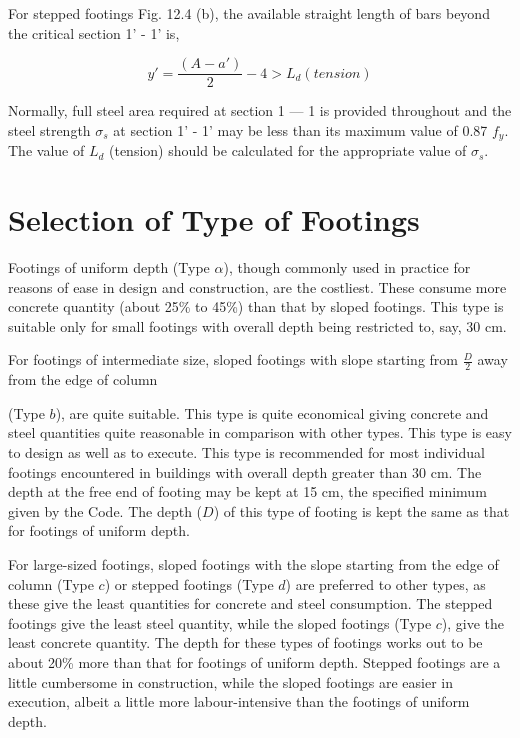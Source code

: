 \documentclass{book}
\begin{document}
For stepped footings Fig. 12.4 (b), the available straight length of bars beyond the critical
section 1’ - 1’ is,
                                                          
\begin{equation}                                                        
        y'= \frac{(A-a')}{2}-4 >L_d (tension)                                      
\end{equation}

Normally, full steel area required at section 1 — 1 is provided throughout and the steel strength $\sigma_s$ at section 1’ - 1’ may be less than its maximum value of 0.87 $f_y$. The value of $L_d$ (tension) should be calculated for the appropriate value of $\sigma_s$.

\section{Selection of Type of Footings}
Footings of uniform depth (Type $\alpha$), though commonly used in practice for reasons of ease in design and construction, are the costliest. These consume more concrete quantity (about 25\% to 45\%) than that by sloped footings. This type is suitable only for small footings with overall depth being restricted to, say, 30 cm.

For footings of intermediate size, sloped footings with slope starting from $\frac{D}{2}$ away from the edge of column

(Type $b$), are quite suitable. This type is quite economical giving concrete and steel quantities quite reasonable in comparison with other types. This type is easy to design as well as to execute. This type is recommended for most individual footings encountered in buildings with overall depth greater than 30 cm. The depth at the free end of footing may be kept at 15 cm, the specified minimum given by the Code. The depth ($D$) of this type of footing is kept the same as that for footings of uniform depth.

For large-sized footings, sloped footings with the slope starting from the edge of column
(Type $c$) or stepped footings (Type $d$) are preferred to other types, as these give the least quantities for concrete and steel consumption. The stepped footings give the least steel quantity, while the sloped footings (Type $c$), give the least concrete quantity. The depth for these types of footings works out to be about 20\% more than that for footings of uniform depth. Stepped footings are a little cumbersome in construction, while the sloped footings are easier in execution, albeit a little more labour-intensive than the footings of uniform depth.
\end{document}
